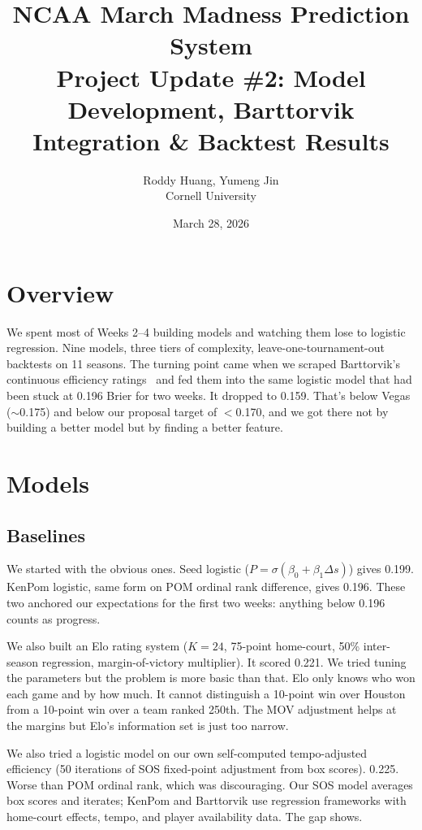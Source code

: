 \documentclass[11pt,a4paper]{article}
\title{%
    \vspace{-1cm}
    {\LARGE\bfseries NCAA March Madness Prediction System}\\[6pt]
    {\large Project Update \#2: Model Development, Barttorvik Integration \& Backtest Results}
}
\author{
    Roddy Huang, Yumeng Jin \\
    Cornell University
}
\date{March 28, 2026}
\begin{document}
\maketitle
\thispagestyle{fancy}


\section{Overview}

We spent most of Weeks 2--4 building models and watching them lose to logistic regression. Nine models, three tiers of complexity, leave-one-tournament-out backtests on 11 seasons. The turning point came when we scraped Barttorvik's continuous efficiency ratings~\citep{barttorvik2017} and fed them into the same logistic model that had been stuck at 0.196 Brier for two weeks. It dropped to 0.159. That's below Vegas ($\sim$0.175) and below our proposal target of $<$0.170, and we got there not by building a better model but by finding a better feature.


\section{Models}

\subsection{Baselines}

We started with the obvious ones. Seed logistic ($P = \sigma(\beta_0 + \beta_1 \Delta s)$) gives 0.199. KenPom logistic, same form on POM ordinal rank difference, gives 0.196. These two anchored our expectations for the first two weeks: anything below 0.196 counts as progress.

We also built an Elo rating system ($K = 24$, 75-point home-court, 50\% inter-season regression, margin-of-victory multiplier). It scored 0.221. We tried tuning the parameters but the problem is more basic than that. Elo only knows who won each game and by how much. It cannot distinguish a 10-point win over Houston from a 10-point win over a team ranked 250th. The MOV adjustment helps at the margins but Elo's information set is just too narrow.

We also tried a logistic model on our own self-computed tempo-adjusted efficiency (50 iterations of SOS fixed-point adjustment from box scores). 0.225. Worse than POM ordinal rank, which was discouraging. Our SOS model averages box scores and iterates; KenPom and Barttorvik use regression frameworks with home-court effects, tempo, and player availability data. The gap shows.
\end{document}
